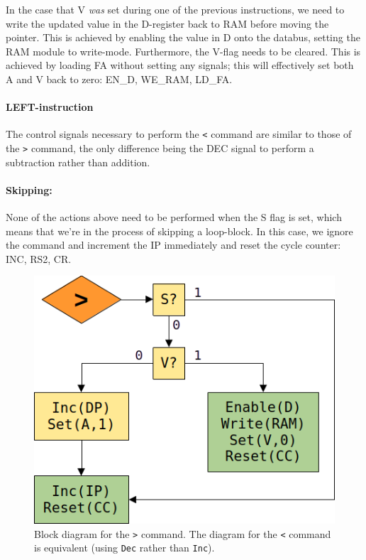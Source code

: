 In the case that V \emph{was} set during one of the previous instructions, we need to write the updated value in the D-register back to RAM before moving the pointer. This is achieved by enabling the value in D onto the databus, setting the RAM module to write-mode. Furthermore, the V-flag needs to be cleared. This is achieved by loading FA without setting any signals; this will effectively set both A and V back to zero: EN\_D, WE\_RAM, LD\_FA.

\paragraph{LEFT-instruction} The control signals necessary to perform the \texttt{<} command are similar to those of the \texttt{>} command, the only difference being the DEC signal to perform a subtraction rather than addition.

\paragraph{Skipping:} None of the actions above need to be performed when the S flag is set, which means that we're in the process of skipping a loop-block. In this case, we ignore the command and increment the IP immediately and reset the cycle counter: INC, RS2, CR.

\begin{figure}[H]
  \centering
  \includegraphics[scale=0.3]{img/rightalg}
  \caption{Block diagram for the \texttt{>} command. The diagram for the \texttt{<} command is equivalent (using \texttt{Dec} rather than \texttt{Inc}).}
  \label{fig:rightalg}
\end{figure}

